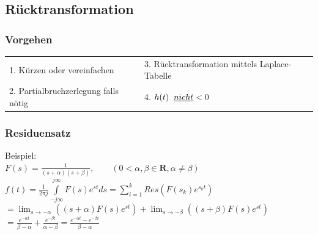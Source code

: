	\subsection{Rücktransformation}
		\subsubsection{Vorgehen}
			\begin{tabular}{p{6cm}p{6cm}}
				1. Kürzen oder vereinfachen &
				3. Rücktransformation mittels Laplace-Tabelle \\
				2. Partialbruchzerlegung falls nötig &
				4. $h(t)\hspace{0.2cm}\underline{nicht} < 0$ \\
			\end{tabular}
			
		\subsubsection{Residuensatz}
			Beispiel:\\
			$F(s) = \frac{1}{(s+\alpha)(s+\beta)}, \qquad (0 < \alpha,\beta \in \mathbf{R}, \alpha \neq \beta)$\\
			$f(t) = \frac{1}{2\pi j} \int\limits_{-j\infty}^{j\infty} F(s)e^{st} ds = \sum\limits_{i=1}^k Res(F(s_k)e^{s_kt})$\\
			$=\lim_{s \to -\alpha} ((s+\alpha)F(s)e^{st}) + \lim_{s \to -\beta}((s+\beta)F(s)e^{st})$\\
			$=\frac{e^{-\alpha t}}{\beta - \alpha} + \frac{e^{-\beta t}}{\alpha - \beta} = \frac{e^{-\alpha t}-e^{-\beta t}}{\beta - \alpha}$
			
			
